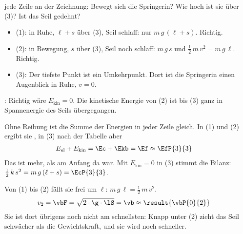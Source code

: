 \begin{abcliste}
\abc
{} jede Zeile an der Zeichnung: Bewegt sich die Springerin? Wie hoch ist sie über (3)? Ist das Seil gedehnt?
\begin{itemize}
 \item (1): in Ruhe, $\ell + s$ über (3), Seil schlaff: nur $m\,g\,(\ell+s)$. Richtig.
 \item (2): in Bewegung, $s$ über (3), Seil noch schlaff: $m\,g\,s$ und $\frac{1}{2}\,m\,v^2 = m\,g\,\ell$. Richtig.
 \item (3): Der tiefste Punkt ist ein Umkehrpunkt. Dort ist die Springerin einen Augenblick in Ruhe, $v = 0$.
\end{itemize}
: Richtig wäre $E_\mathrm{kin} = 0$. Die kinetische Energie von (2) ist bis (3) ganz in Spannenergie des Seils übergegangen.

\abc
Ohne Reibung ist die Summe der Energien in jeder Zeile gleich. In (1) und (2) ergibt sie , in (3) nach der Tabelle aber
\begin{align}
 E_\mathrm{el} + E_\mathrm{kin} &= \Ec + \Ekb = \Ef \approx \EfP{3}{3}
\end{align}
Das ist mehr, als am Anfang da war. Mit $E_\mathrm{kin} = 0$ in (3) stimmt die Bilanz: $\frac{1}{2}\,k\,s^2 = m\,g\,(\ell+s) = \EcP{3}{3}$.

\abc
Von (1) bis (2) fällt sie frei um $\ell$: $m\,g\,\ell = \frac{1}{2}\,m\,v^2$.
\begin{align}
 v_2 &= \vbF = \sqrt{2\cdot\g\cdot\lS} = \vb \approx \result{\vbP{0}{2}}
\end{align}
Sie ist dort übrigens noch nicht am schnellsten: Knapp unter (2) zieht das Seil schwächer als die Gewichtskraft, und sie wird noch schneller.
\end{abcliste}
